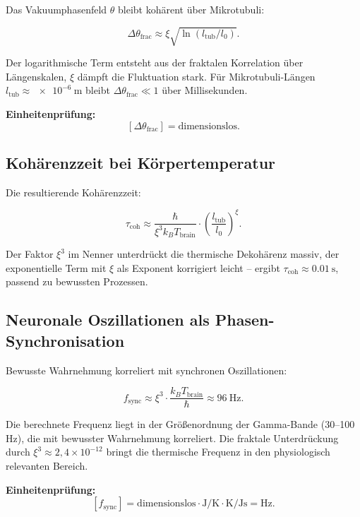 	Das Vakuumphasenfeld \(\theta\) bleibt kohärent über Mikrotubuli:
	
	\begin{equation}
		\Delta \theta_{\text{frac}} \approx \xi \sqrt{\ln(l_{\text{tub}}/l_0)}.
	\end{equation}
	
	Der logarithmische Term entsteht aus der fraktalen Korrelation über Längenskalen, \(\xi\) dämpft die Fluktuation stark. Für Mikrotubuli-Längen \(l_{\text{tub}} \approx \SI{e-6}{\meter}\) bleibt \(\Delta \theta_{\text{frac}} \ll 1\) über Millisekunden.
	
	\textbf{Einheitenprüfung:}
	\[
	[\Delta \theta_{\text{frac}}] = \text{dimensionslos}.
	\]
	
	\subsection*{Kohärenzzeit bei Körpertemperatur}
	
	Die resultierende Kohärenzzeit:
	
	\begin{equation}
		\tau_{\text{coh}} \approx \frac{\hbar}{\xi^3 k_B T_{\text{brain}}} \cdot \left( \frac{l_{\text{tub}}}{l_0} \right)^{\xi}.
	\end{equation}
	
	Der Faktor \(\xi^3\) im Nenner unterdrückt die thermische Dekohärenz massiv, der exponentielle Term mit \(\xi\) als Exponent korrigiert leicht – ergibt \(\tau_{\text{coh}} \approx \SI{0.01}{\second}\), passend zu bewussten Prozessen.
	
	\subsection*{Neuronale Oszillationen als Phasen-Synchronisation}
	
	Bewusste Wahrnehmung korreliert mit synchronen Oszillationen:
	
	\begin{equation}
		f_{\text{sync}} \approx \xi^{3} \cdot \frac{k_B T_{\text{brain}}}{\hbar} \approx \SI{96}{\hertz}.
	\end{equation}
	
	Die berechnete Frequenz liegt in der Größenordnung der Gamma-Bande (30--100 Hz), die mit bewusster Wahrnehmung korreliert. Die fraktale Unterdrückung durch \(\xi^3 \approx 2{,}4 \times 10^{-12}\) bringt die thermische Frequenz in den physiologisch relevanten Bereich.
	
	\textbf{Einheitenprüfung:}
	\[
	[f_{\text{sync}}] = \text{dimensionslos} \cdot \si{\joule\per\kelvin} \cdot \si{\kelvin} / \si{\joule\second} = \si{\hertz}.
	\]
	
